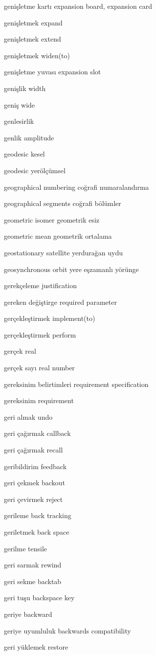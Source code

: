 \documentclass[12pt,fleqn]{article}\usepackage{../../common}
\begin{document}
genişletme kartı expansion board, expansion card

genişletmek expand

genişletmek extend

genişletmek widen(to)

genişletme yuvası expansion slot

genişlik width

geniş wide

genlesirlik

genlik amplitude

geodesic kesel

geodesic yerölçümsel

geographical numbering coğrafi numaralandırma

geographical segments coğrafi bölümler

geometric isomer geometrik esiz

geometric mean geometrik ortalama

geostationary satellite yerdurağan uydu

geosynchronous orbit yere eşzamanlı yörünge

gerekçeleme justification

gereken değiştirge required parameter

gerçekleştirmek implement(to)

gerçekleştirmek perform

gerçek real

gerçek sayı real number

gereksinim belirtimleri requirement specification

gereksinim requirement

geri almak undo

geri çağırmak callback

geri çağırmak recall

geribildirim feedback

geri çekmek backout

geri çevirmek reject

gerileme back tracking

geriletmek back space

gerilme tensile

geri sarmak rewind

geri sekme backtab

geri tuşu backspace key

geriye backward

geriye uyumluluk backwards compatibility

geri yüklemek restore
\end{document}
